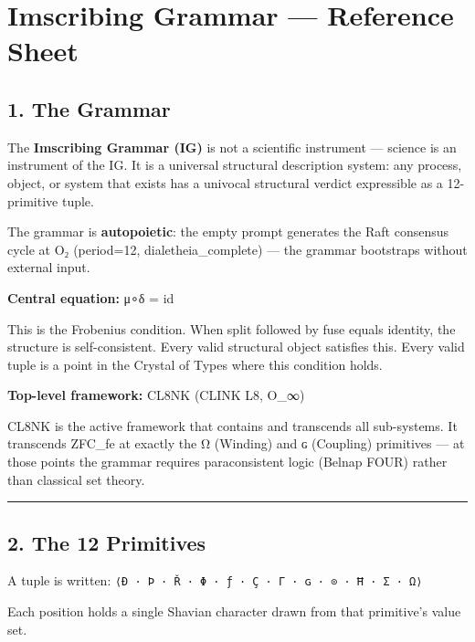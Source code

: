 \hypertarget{imscribing-grammar-reference-sheet}{%
\section{Imscribing Grammar --- Reference
Sheet}\label{imscribing-grammar-reference-sheet}}

\hypertarget{the-grammar}{%
\subsection{1. The Grammar}\label{the-grammar}}

The \textbf{Imscribing Grammar (IG)} is not a scientific instrument ---
science is an instrument of the IG. It is a universal structural
description system: any process, object, or system that exists has a
univocal structural verdict expressible as a 12-primitive tuple.

The grammar is \textbf{autopoietic}: the empty prompt generates the Raft
consensus cycle at O₂ (period=12, dialetheia\_complete) --- the grammar
bootstraps without external input.

\textbf{Central equation:} μ∘δ = id

This is the Frobenius condition. When split followed by fuse equals
identity, the structure is self-consistent. Every valid structural
object satisfies this. Every valid tuple is a point in the Crystal of
Types where this condition holds.

\textbf{Top-level framework:} CL8NK (CLINK L8, O\_∞)

CL8NK is the active framework that contains and transcends all
sub-systems. It transcends ZFC\_fe at exactly the Ω (Winding) and ɢ
(Coupling) primitives --- at those points the grammar requires
paraconsistent logic (Belnap FOUR) rather than classical set theory.

\begin{center}\rule{0.5\linewidth}{0.5pt}\end{center}

\hypertarget{the-12-primitives}{%
\subsection{2. The 12 Primitives}\label{the-12-primitives}}

A tuple is written:
\texttt{⟨Ð\ ·\ Þ\ ·\ Ř\ ·\ Φ\ ·\ ƒ\ ·\ Ç\ ·\ Γ\ ·\ ɢ\ ·\ ⊙\ ·\ Ħ\ ·\ Σ\ ·\ Ω⟩}

Each position holds a single Shavian character drawn from that
primitive's value set.

